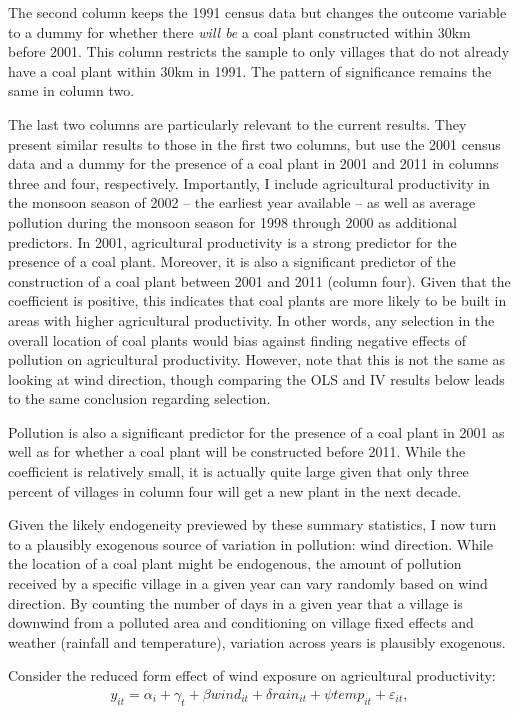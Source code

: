 \documentclass[
]{article}
\begin{document}
The second column keeps the 1991 census data but changes the outcome variable to a dummy for whether there \emph{will be} a coal plant constructed within 30km before 2001. This column restricts the sample to only villages that do not already have a coal plant within 30km in 1991. The pattern of significance remains the same in column two.

The last two columns are particularly relevant to the current results. They present similar results to those in the first two columns, but use the 2001 census data and a dummy for the presence of a coal plant in 2001 and 2011 in columns three and four, respectively. Importantly, I include agricultural productivity in the monsoon season of 2002 -- the earliest year available -- as well as average pollution during the monsoon season for 1998 through 2000 as additional predictors. In 2001, agricultural productivity is a strong predictor for the presence of a coal plant. Moreover, it is also a significant predictor of the construction of a coal plant between 2001 and 2011 (column four). Given that the coefficient is positive, this indicates that coal plants are more likely to be built in areas with higher agricultural productivity. In other words, any selection in the overall location of coal plants would bias against finding negative effects of pollution on agricultural productivity. However, note that this is not the same as looking at wind direction, though comparing the OLS and IV results below leads to the same conclusion regarding selection.

Pollution is also a significant predictor for the presence of a coal plant in 2001 as well as for whether a coal plant will be constructed before 2011. While the coefficient is relatively small, it is actually quite large given that only three percent of villages in column four will get a new plant in the next decade.

Given the likely endogeneity previewed by these summary statistics, I now turn to a plausibly exogenous source of variation in pollution: wind direction. While the location of a coal plant might be endogenous, the amount of pollution received by a specific village in a given year can vary randomly based on wind direction. By counting the number of days in a given year that a village is downwind from a polluted area and conditioning on village fixed effects and weather (rainfall and temperature), variation across years is plausibly exogenous.

Consider the reduced form effect of wind exposure on agricultural productivity:
\begin{gather} y_{it} = \alpha_{i} + \gamma_{t} + \beta wind_{it} + \delta rain_{it} + \psi temp_{it} + \varepsilon_{it}, \end{gather}
\end{document}
